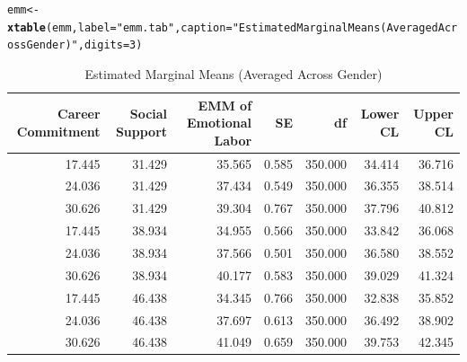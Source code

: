 \documentclass{article}\usepackage[]{graphicx}\usepackage[]{xcolor}
\makeatletter
\newcommand{\hlnum}[1]{\textcolor[rgb]{0.686,0.059,0.569}{#1}}%
\newcommand{\hlsng}[1]{\textcolor[rgb]{0.192,0.494,0.8}{#1}}%
\newcommand{\hldef}[1]{\textcolor[rgb]{0.345,0.345,0.345}{#1}}%
\newcommand{\hlkwb}[1]{\textcolor[rgb]{0.69,0.353,0.396}{#1}}%
\newcommand{\hlkwc}[1]{\textcolor[rgb]{0.333,0.667,0.333}{#1}}%
\newcommand{\hlkwd}[1]{\textcolor[rgb]{0.737,0.353,0.396}{\textbf{#1}}}%
\newenvironment{kframe}{%
 \def\at@end@of@kframe{}%
 \ifinner\ifhmode%
  \def\at@end@of@kframe{\end{minipage}}%
  \begin{minipage}{\columnwidth}%
 \fi\fi%
 \def\FrameCommand##1{\hskip\@totalleftmargin \hskip-\fboxsep
 \colorbox{shadecolor}{##1}\hskip-\fboxsep
     \hskip-\linewidth \hskip-\@totalleftmargin \hskip\columnwidth}%
 \MakeFramed {\advance\hsize-\width
   \@totalleftmargin\z@ \linewidth\hsize
   \@setminipage}}%
 {\par\unskip\endMakeFramed%
 \at@end@of@kframe}
\newenvironment{knitrout}{}{} %
\makeatother
\begin{document}
\begin{enumerate}
\begin{enumerate}
\begin{knitrout}
\begin{kframe}
\begin{alltt}
\hldef{emm} \hlkwb{<-} \hlkwd{xtable}\hldef{(emm,}\hlkwc{label} \hldef{=} \hlsng{"emm.tab"}\hldef{,} \hlkwc{caption} \hldef{=} \hlsng{"Estimated Marginal Means (Averaged Across Gender)"}\hldef{,} \hlkwc{digits} \hldef{=} \hlnum{3}\hldef{)}
\end{alltt}
\end{kframe}
\end{knitrout}
    
    
\begin{table}[H]
\centering
\begingroup\normalsize
\begin{tabular}{rrrrrrr}
  \hline
Career Commitment & Social Support & EMM of Emotional Labor & SE & df & Lower CL & Upper CL \\ 
  \hline
17.445 & 31.429 & 35.565 & 0.585 & 350.000 & 34.414 & 36.716 \\ 
  24.036 & 31.429 & 37.434 & 0.549 & 350.000 & 36.355 & 38.514 \\ 
  30.626 & 31.429 & 39.304 & 0.767 & 350.000 & 37.796 & 40.812 \\ 
  17.445 & 38.934 & 34.955 & 0.566 & 350.000 & 33.842 & 36.068 \\ 
  24.036 & 38.934 & 37.566 & 0.501 & 350.000 & 36.580 & 38.552 \\ 
  30.626 & 38.934 & 40.177 & 0.583 & 350.000 & 39.029 & 41.324 \\ 
  17.445 & 46.438 & 34.345 & 0.766 & 350.000 & 32.838 & 35.852 \\ 
  24.036 & 46.438 & 37.697 & 0.613 & 350.000 & 36.492 & 38.902 \\ 
  30.626 & 46.438 & 41.049 & 0.659 & 350.000 & 39.753 & 42.345 \\ 
   \hline
\end{tabular}
\endgroup
\caption{Estimated Marginal Means (Averaged Across Gender)} 
\label{emm.tab}
\end{table}

 
 
 \begin{figure}[H]
 
 \centering
 

\end{figure}
\end{enumerate}
\end{enumerate}
\end{document}
